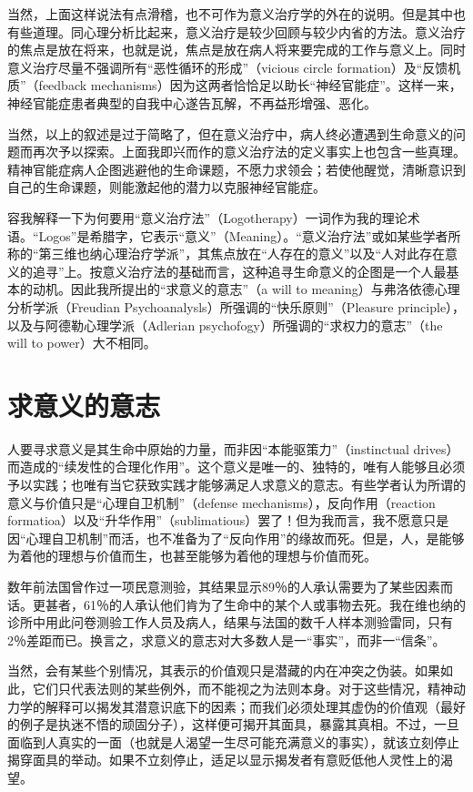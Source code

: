 \documentclass[11pt,oneside]{book}
\begin{document}
\begin{common-format}
当然，上面这样说法有点滑稽，也不可作为意义治疗学的外在的说明。但是其中也有些道理。同心理分析比起来，意义治疗是较少回顾与较少内省的方法。意义治疗的焦点是放在将来，也就是说，焦点是放在病人将来要完成的工作与意义上。同时意义治疗尽量不强调所有“恶性循环的形成”（vicious circle formation）及“反馈机质”（feedback mechanisms）因为这两者恰恰足以助长“神经官能症”。这样一来，神经官能症患者典型的自我中心遂告瓦解，不再益形增强、恶化。

当然，以上的叙述是过于简略了，但在意义治疗中，病人终必遭遇到生命意义的问题而再次予以探索。上面我即兴而作的意义治疗法的定义事实上也包含一些真理。精神官能症病人企图逃避他的生命课题，不愿力求领会；若使他醒觉，清晰意识到自己的生命课题，则能激起他的潜力以克服神经官能症。

容我解释一下为何要用“意义治疗法”（Logotherapy）一词作为我的理论术语。“Logos”是希腊字，它表示“意义”（Meaning）。“意义治疗法”或如某些学者所称的“第三维也纳心理治疗学派”，其焦点放在“人存在的意义”以及“人对此存在意义的追寻”上。按意义治疗法的基础而言，这种追寻生命意义的企图是一个人最基本的动机。因此我所提出的“求意义的意志”（a will to meaning）与弗洛依德心理分析学派（Freudian Psychoanalysls）所强调的“快乐原则”（Pleasure principle），以及与阿德勒心理学派（Adlerian psychofogy）所强调的“求权力的意志”（the will to power）大不相同。


\section{求意义的意志}
人要寻求意义是其生命中原始的力量，而非因“本能驱策力”（instinctual drives）而造成的“续发性的合理化作用”。这个意义是唯一的、独特的，唯有人能够且必须予以实践；也唯有当它获致实践才能够满足人求意义的意志。有些学者认为所谓的意义与价值只是“心理自卫机制”（defense mechanisms），反向作用（reaction formatioa）以及“升华作用”（sublimatious）罢了！但为我而言，我不愿意只是因“心理自卫机制”而活，也不准备为了“反向作用”的缘故而死。但是，人，是能够为着他的理想与价值而生，也甚至能够为着他的理想与价值而死。

数年前法国曾作过一项民意测验，其结果显示89％的人承认需要为了某些因素而话。更甚者，61％的人承认他们肯为了生命中的某个人或事物去死。我在维也纳的诊所中用此问卷测验工作人员及病人，结果与法国的数千人样本测验雷同，只有2％差距而已。换言之，求意义的意志对大多数人是一“事实”，而非一“信条”。

当然，会有某些个别情况，其表示的价值观只是潜藏的内在冲突之伪装。如果如此，它们只代表法则的某些例外，而不能视之为法则本身。对于这些情况，精神动力学的解释可以揭发其潜意识底下的因素；而我们必须处理其虚伪的价值观（最好的例子是执迷不悟的顽固分子），这样便可揭开其面具，暴露其真相。不过，一旦面临到人真实的一面（也就是人渴望一生尽可能充满意义的事实），就该立刻停止揭穿面具的举动。如果不立刻停止，适足以显示揭发者有意贬低他人灵性上的渴望。



\end{common-format}
\end{document}
